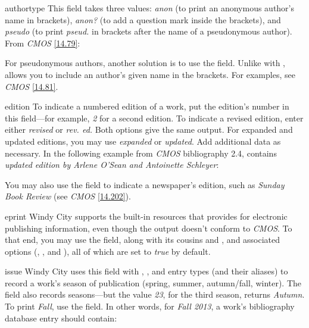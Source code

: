 \documentclass[11pt,letterpaper,oneside]{article}
\begin{document}
\begin{marglist}

\item[authortype] This field takes three values: \textit{anon} (to
print an anonymous author's name in brackets), \textit{anon?} (to add
a question mark inside the brackets), and \textit{pseudo} (to print
\textit{pseud.} in brackets after the name of a pseudonymous author).
From \textit{CMOS} \ref{14.79}:

\begin{citebib}
\item \cite{horsley1796}
\item \cite{hawkes1834}
\end{citebib}

For pseudonymous authors, another solution is to use the
 field. Unlike with ,
 allows you to include an author's given name in
the brackets. For examples, see \textit{CMOS} \ref{14.81}.

\item[edition] To indicate a numbered edition of a work, put the
edition's number in this field---for example, \textit{2} for a second
edition. To indicate a revised edition, enter either \textit{revised}
or \textit{rev. ed.} Both options give the same output. For expanded
and updated editions, you may use \textit{expanded} or
\textit{updated}. Add additional data as necessary. In the following
example from \textit{CMOS} bibliography 2.4, 
contains \textit{updated edition by Arlene O'Sean and Antoinette
Schleyer}:

\begin{bibonly}
\nocite{swanson1999}
\end{bibonly}

\noindent You may also use the field to indicate a newspaper's
edition, such as \textit{Sunday Book Review} (see \textit{CMOS}
\ref{14.202}).

\item[eprint] Windy City supports the built-in resources that
\biblatex provides for electronic publishing information, even though
the output doesn't conform to \textit{CMOS}. To that end, you may use
the  field, along with its cousins
 and , and associated
options (, , and ), all of which are set
to \textit{true} by default.

\item[issue] Windy City uses this field with ,
, and  entry types (and their aliases)
to record a work's season of publication (spring, summer, autumn/fall,
winter). The  field also records seasons---but the value
\textit{23}, for the third season, returns \textit{Autumn}. To print
\textit{Fall}, use the  field. In other words, for
\textit{Fall 2013}, a work's bibliography database entry should
contain:


\end{marglist}
\end{document}
